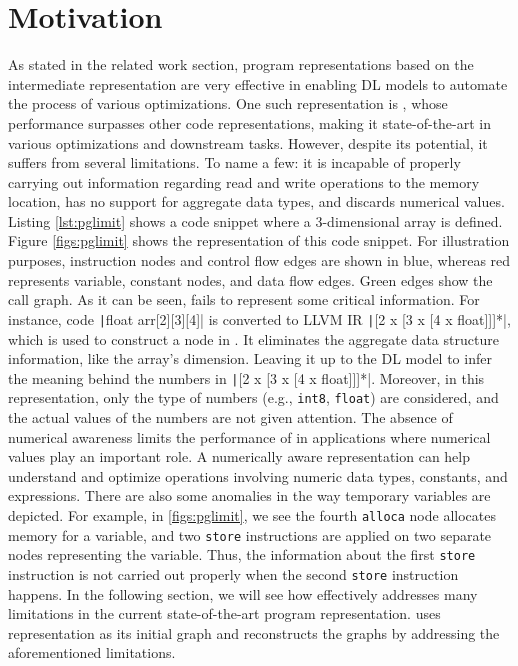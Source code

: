 \vspace{-10pt}
\section{Motivation}
\label{sec:motivation}
\vspace{-10pt}
As stated in the related work section, program representations based on the intermediate representation are very effective in enabling DL models to automate the process of various optimizations. One such representation is \programl, whose performance surpasses other code representations, making it state-of-the-art in various optimizations and downstream tasks. However, despite its potential, it suffers from several limitations. To name a few: it is incapable of properly carrying out information regarding read and write operations to the memory location, has no support for aggregate data types, and discards numerical values. Listing \ref{lst:pglimit} shows a code snippet where a 3-dimensional array is defined.
Figure \ref{figs:pglimit} shows the \programl representation of this code snippet. For illustration purposes, instruction nodes and control flow edges are shown in blue, whereas red represents variable, constant nodes, and data flow edges. Green edges show the call graph.
As it can be seen, \programl fails to represent some critical information. 
For instance, code \texttt|float arr[2][3][4]| is converted to LLVM IR \texttt|[2 x [3 x [4 x float]]]*|, which is used to construct a node in \programl.
It eliminates the aggregate data structure information, like the array's dimension. Leaving it up to the DL model to infer the meaning behind the numbers in \texttt|[2 x [3 x [4 x float]]]*|.
Moreover, in this representation, only the type of numbers (e.g., \texttt{int8}, \texttt{float}) are considered, and the actual values of the numbers are not given attention.
The absence of numerical awareness limits the performance of \programl in applications where numerical values play an important role. A numerically aware representation can help understand and optimize operations involving numeric data types, constants, and expressions. There are also some anomalies in the way temporary variables are depicted. For example, in \ref{figs:pglimit}, we see the fourth \texttt{alloca} node allocates memory for a variable, and two \texttt{store} instructions are applied on two separate nodes representing the variable. Thus, the information about the first \texttt{store} instruction is not carried out properly when the second \texttt{store} instruction happens. In the following section, we will see how \ourtool effectively addresses many limitations in the current state-of-the-art program representation. 
\ourtool uses \programl representation as its initial graph and reconstructs the graphs by addressing the aforementioned limitations.

